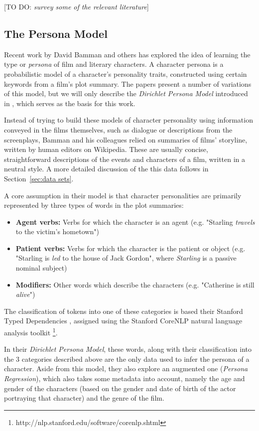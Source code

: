\documentclass[bsc,frontabs,singlespacing,parskip]{infthesis} %
\begin{document}
[TO DO: \textit{survey some of the relevant literature}]

\subsection{The Persona Model}

Recent work by David Bamman and others has explored the idea of learning the type or \textit{persona} of film \cite{Bamman2013} and literary \cite{Bamman2014} characters. A character persona is a probabilistic model of a character's personality traits, constructed using certain keywords from a film's plot summary. The papers present a number of variations of this model, but we will only describe the \textit{Dirichlet Persona Model} introduced in \cite{Bamman2014}, which serves as the basis for this work.

Instead of trying to build these models of character personality using information conveyed in the films themselves, such as dialogue or descriptions from the screenplays, Bamman and his colleagues relied on summaries of films' storyline, written by human editors on Wikipedia. These are usually concise, straightforward descriptions of the events and characters of a film, written in a neutral style. A more detailed discussion of the this data follows in Section~\ref{sec:data sets}. 

A core assumption in their model is that character personalities are primarily represented by three types of words in the plot summaries:
\begin{itemize}
	\item \textbf{Agent verbs:} Verbs for which the character is an agent (e.g. "Starling \textit{travels} to the victim's hometown")
	\item \textbf{Patient verbs:} Verbs for which the character is the patient or object (e.g. "Starling is \textit{led} to the house of Jack Gordon", where \textit{Starling} is a passive nominal subject)
	\item \textbf{Modifiers:} Other words which describe the characters (e.g. "Catherine is still \textit{alive}")
\end{itemize}
The classification of tokens into one of these categories is based their Stanford Typed Dependencies \cite{de2008stanford}, assigned using the Stanford CoreNLP natural language analysis toolkit \footnote{http://nlp.stanford.edu/software/corenlp.shtml}.

In their \textit{Dirichlet Persona Model}, these words, along with their classification into the 3 categories described above are the only data used to infer the persona of a character. Aside from this model, they also explore an augmented one (\textit{Persona Regression}), which also takes some metadata into account, namely the age and gender of the characters (based on the gender and date of birth of the actor portraying that character) and the genre of the film.
\end{document}
